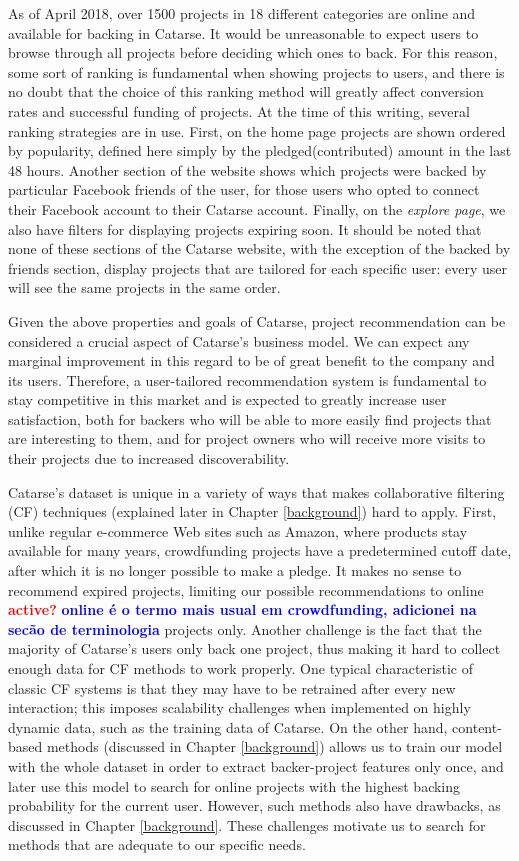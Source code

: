 \documentclass[cic,tc,english]{iiufrgs}
\newcommand{\bruno}[1]{\textcolor{red}{\textbf{#1}}}
\newcommand{\adriano}[1]{\textcolor{blue}{\textbf{#1}}}
\begin{document}
As of April 2018, over 1500 projects in 18 different categories are online and available for backing in Catarse. It would be unreasonable to expect users to browse through all projects before deciding which ones to back. For this reason, some sort of ranking is fundamental when showing projects to users, and there is no doubt that the choice of this ranking method will greatly affect conversion rates and successful funding of projects. At the time of this writing, several ranking strategies are in use. First, on the home page projects are shown ordered by popularity, defined here simply by the pledged(contributed) amount in the last 48 hours. Another section of the website shows which projects were backed by particular Facebook friends of the user, for those users who opted to connect their Facebook account to their Catarse account. Finally, on the \emph{explore page}, we also have filters for displaying projects expiring soon. It should be noted that none of these sections of the Catarse website, with the exception of the backed by friends section, display projects that are tailored for each specific user: every user will see the same projects in the same order.

Given the above properties and goals of Catarse, project recommendation can be considered a crucial aspect of Catarse's business model. We can expect any marginal improvement in this regard to be of great benefit to the company and its users. Therefore, a user-tailored recommendation system is fundamental to stay competitive in this market and is expected to greatly increase user satisfaction, both for backers who will be able to more easily find projects that are interesting to them, and for project owners who will receive more visits to their projects due to increased discoverability.

Catarse's dataset is unique in a variety of ways that makes collaborative filtering (CF) techniques (explained later in Chapter \ref{background}) hard to apply. First, unlike regular e-commerce Web sites such as Amazon, where products stay available for many years, crowdfunding projects have a predetermined cutoff date, after which it is no longer possible to make a pledge. It makes no sense to recommend expired projects, limiting our possible recommendations to online \bruno{active?} \adriano{online é o termo mais usual em crowdfunding, adicionei na secão de terminologia} projects only. Another challenge is the fact that the majority of Catarse's users only back one project, thus making it hard to collect enough data for CF methods to work properly. One typical characteristic of classic CF systems is that they may have to be retrained after every new interaction; this imposes scalability challenges when implemented on highly dynamic data, such as the training data of Catarse. On the other hand, content-based methods (discussed in Chapter \ref{background}) allows us to train our model with the whole dataset in order to extract backer-project features only once, and later use this model to search for online projects with the highest backing probability for the current user. However, such methods also have drawbacks, as discussed in Chapter \ref{background}. These challenges motivate us to search for methods that are adequate to our specific needs.
\end{document}
